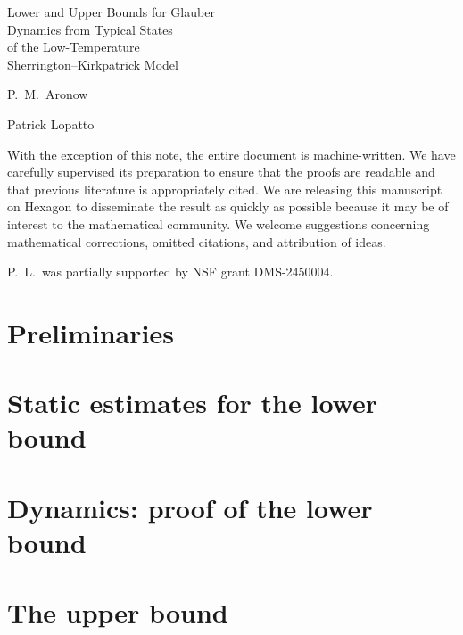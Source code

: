 \documentclass[12pt,oneside,openany]{book}
\theoremstyle{definition}
\theoremstyle{plain}
\numberwithin{equation}{chapter}
\theoremstyle{plain}
\theoremstyle{definition}
\theoremstyle{remark}
\newcommand{\npptitlepage}[2]{%
  \hypersetup{pageanchor=false}%
  \begin{titlepage}
  \centering\normalfont
  \vspace*{\stretch{1}}
  {\fontsize{28}{35}\selectfont #1\par}
  \vspace{1.1in}
  {\Large\def\\{\par\vspace{10pt}}#2\par}
  \vspace*{\stretch{1.6}}
  \end{titlepage}%
  \hypersetup{pageanchor=true}}
\begin{document}
\frontmatter
\npptitlepage{Lower and Upper Bounds for Glauber\\ Dynamics from Typical States\\ of the Low-Temperature\\ Sherrington--Kirkpatrick Model}{P.\ M.\ Aronow\\ Patrick Lopatto}
\begin{authorsnote}
With the exception of this note, the entire
document is machine-written. We have carefully supervised its preparation
to ensure that the proofs are readable and that
previous literature is appropriately cited. We are
releasing this manuscript on Hexagon to disseminate the result as quickly as
possible because it may be of interest to the mathematical
community. 
We welcome suggestions concerning mathematical corrections, omitted citations, and attribution of ideas.

P.\ L.\ was partially supported by NSF grant DMS-2450004.
\end{authorsnote}
\begin{abstractpage}

\end{abstractpage}
\tableofcontents
\mainmatter



\part{Preliminaries}\label{part:prelim}


\part{Static estimates for the lower bound}\label{part:static}





\part{Dynamics: proof of the lower bound}\label{part:dynamics}



\part{The upper bound}\label{part:upper}







\end{document}
